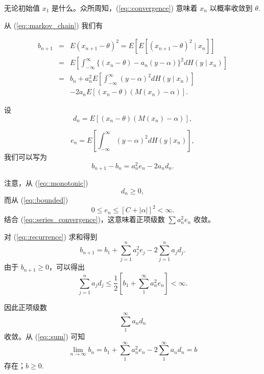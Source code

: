 \documentclass{article}
\begin{document}
无论初始值 $x_1$ 是什么。众所周知，(\ref{eq::convergence}) 意味着 $x_n$ 以概率收敛到 $\theta$.

从 (\ref{eq::markov_chain}) 我们有

\begin{equation}
    \begin{array}{rcl}
    b_{n+1} &=& E(x_{n+1} - \theta)^2 = E[E[(x_{n+1} - \theta)^2 \mid x_n]] \\
    &=& E \left[ \int_{-\infty}^{\infty} \{(x_n - \theta) - a_n(y - \alpha)\}^2 dH(y \mid x_n) \right] \\
    &=& b_n + a_n^2 E \left[ \int_{-\infty}^{\infty} (y - \alpha)^2 dH(y \mid x_n) \right] \\
    &&- 2a_n E[(x_n - \theta)(M(x_n) - \alpha)].
    \end{array}
\end{equation}

设
\begin{equation}
    d_n = E[(x_n - \theta)(M(x_n) - \alpha)],
\end{equation}

\begin{equation}
    e_n = E \left[ \int_{-\infty}^{\infty} (y - \alpha)^2 dH(y \mid x_n) \right],
\end{equation}
我们可以写为
\begin{equation}
    \label{eq::recurrence}
    b_{n + 1} - b_n = a_n^2 e_n - 2a_n d_n.
\end{equation}

注意，从 (\ref{eq::monotonic})
$$ 
    d_n \geq 0, 
$$
而从 (\ref{eq::bounded})
$$
    0 \leq e_n \leq [C + |\alpha|]^2 < \infty. 
$$
结合 (\ref{eq::series_convergence})，这意味着正项级数 $\sum a_n^2 e_n$ 收敛。

对 (\ref{eq::recurrence}) 求和得到
\begin{equation}
    \label{eq::sum}
    b_{n+1} = b_1 + \sum_{j=1}^{n} a_j^2 e_j - 2 \sum_{j=1}^{n} a_j d_j.
\end{equation}
由于 $b_{n+1} \geq 0$，可以得出
\begin{equation}
    \sum_{j=1}^{n} a_j d_j \leq \frac{1}{2} \left[ b_1 
    + \sum_{1}^{\infty} a_n^2 e_n \right] < \infty.
\end{equation}

因此正项级数
\begin{equation}
    \label{eq::postive_series}
    \sum_{1}^{\infty} a_n d_n
\end{equation}
收敛。从 (\ref{eq::sum}) 可知
\begin{equation}
    \lim_{n \to \infty} b_n = b_1 
    + \sum_{1}^{\infty} a_n^2 e_n - 2 \sum_{1}^{\infty} a_n d_n = b
\end{equation}
存在；$b \geq 0$.
\end{document}
